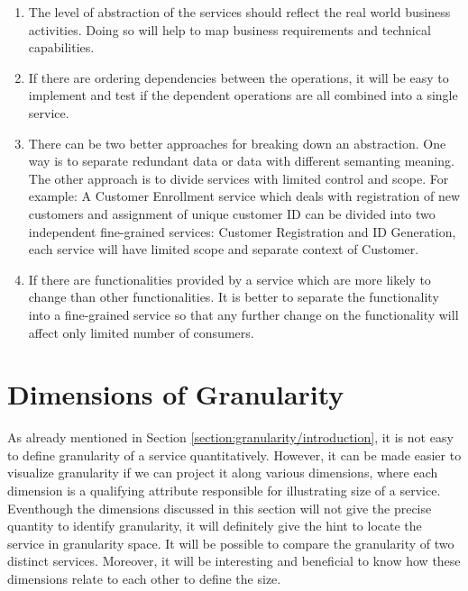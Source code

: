\begin{enumerate}
\item The level of abstraction of the services should reflect the real world business activities. Doing so will help to map business requirements and technical capabilities. \cite{Pierre-Reldin:2007aa}

\item If there are ordering dependencies between the operations, it will be easy to implement and test if the dependent operations are all combined into a single service. \cite{Bianco:2007aa}

\item There can be two better approaches for breaking down an abstraction. One way is to separate redundant data or data with different semanting meaning. The other approach is to divide services with limited control and scope. For example: A Customer Enrollment service which deals with registration of new customers and assignment of unique customer ID can be divided into two independent fine-grained services: Customer Registration and ID Generation, each service will have limited scope and separate context of Customer.\cite{Pierre-Reldin:2007aa}

\item If there are functionalities provided by a service which are more likely to change than other functionalities. It is better to separate the functionality into a fine-grained service so that any further change on the functionality will affect only limited number of consumers. \cite{Bianco:2007aa}
 
\end{enumerate}

\section{Dimensions of Granularity}\label{section:granularity/dimensions}
As already mentioned in Section \ref{section:granularity/introduction}, it is not easy to define granularity of a service quantitatively. However, it can be made easier to visualize granularity if we can project it along various dimensions, where each dimension is a qualifying attribute responsible for illustrating size of a service. Eventhough the  dimensions discussed in this section will not give the precise quantity to identify granularity, it will definitely give the hint to locate the service in granularity space. It will be possible to compare the granularity of two distinct services. Moreover, it will be interesting and beneficial to know how these dimensions relate to each other to define the size.


